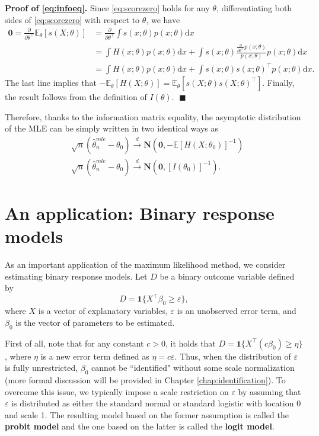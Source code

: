 \documentclass[10.5pt, A4paper, openany, uplatex]{book}
\newcommand{\mbf}{\mathbf}
\newcommand{\mrm}{\mathrm}
\newcommand{\eps}{\varepsilon}
\newcommand{\E}{\mathbb{E}}
\renewcommand{\hat}{\widehat}
\numberwithin{equation}{section}
\begin{document}
\textbf{Proof of \eqref{eq:infoeq}.} \quad Since \eqref{eq:scorezero} holds for any $\theta$, differentiating both sides of \eqref{eq:scorezero} with respect to $\theta$, we have
\begin{align*}
	\mbf{0} = \frac{\partial }{\partial \theta^\top} \E_\theta[s(X; \theta)] 
	& = \frac{\partial}{\partial \theta^\top}\int s(x; \theta) p(x; \theta) \mrm{d}x \\
	& = \int H(x; \theta) p(x; \theta) \mrm{d}x + \int s(x; \theta) \frac{\frac{\partial}{\partial \theta^\top} p(x; \theta)}{p(x; \theta)} p(x; \theta) \mrm{d}x \\
	& = \int H(x; \theta) p(x; \theta) \mrm{d}x + \int s(x; \theta) s(x; \theta)^\top p(x; \theta) \mrm{d}x.
\end{align*} 
The last line implies that $-\E_\theta[H(X; \theta)] = \E_\theta[s(X; \theta) s(X; \theta)^\top]$.
Finally, the result follows from the definition of $I(\theta)$. $\; \blacksquare$

Therefore, thanks to the information matrix equality, the asymptotic distribution of the MLE can be simply written in two identical ways as
\begin{align*}
	& \sqrt{n}(\hat \theta_n^{mle} - \theta_0) \overset{d}{\to} \mbf{N}\left( \mbf{0}, -\E[H(X; \theta_0)]^{-1}  \right) \\
	& \sqrt{n}(\hat \theta_n^{mle} - \theta_0) \overset{d}{\to} \mbf{N}\left( \mbf{0}, [I(\theta_0)]^{-1}  \right).
\end{align*}

\section{An application: Binary response models}\label{sec:binary}
As an important application of the maximum likelihood method, we consider estimating binary response models.
Let $D$ be a binary outcome variable defined by
\[
	D = \mbf{1}\{X^\top\beta_0 \ge \eps\},
\]
where $X$ is a vector of explanatory variables, $\eps$ is an unobserved error term, and $\beta_0$ is the vector of parameters to be estimated.

First of all, note that for any constant $c > 0$, it holds that  $D = \mbf{1}\{X^\top(c\beta_0) \ge \eta\}$, where $\eta$ is a new error term defined as $\eta = c\eps$.
Thus, when the distribution of $\eps$ is fully unrestricted, $\beta_0$ cannot be ``identified" without some scale normalization (more formal discussion will be provided in Chapter \ref{chap:identification}). 
To overcome this issue, we typically impose a scale restriction on $\eps$ by assuming that $\eps$ is distributed as either the standard normal or standard logistic with location 0 and scale 1.
The resulting model based on the former assumption is called the \textbf{probit model} and the one based on the latter is called the \textbf{logit model}.
\end{document}
